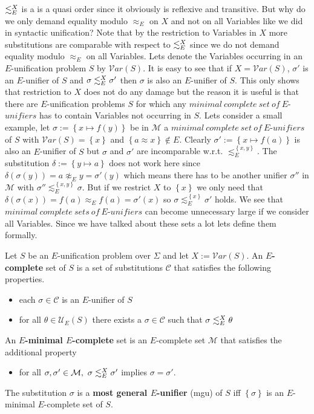 $\lesssim^X_E$ is a is a quasi order since it obviously is reflexive and transitive. But why do we only demand equality modulo $\approx_E$ on $X$ and not on all Variables like we did in syntactic unification? Note that by the restriction to Variables in $X$ more substitutions are comparable with respect to $\lesssim^X_E$ since we do not demand equality modulo $\approx_E$ on all Variables. Lets denote the Variables occurring in an $E$-unification problem $S$ by $\mathcal{V}ar(S)$. It is easy to see that if $X=\mathcal{V}ar(S)$, $\sigma'$ is an $E$-unifier of $S$ and $\sigma\lesssim^X_E\sigma'$ then $\sigma$ is also an $E$-unifier of $S$. This only shows that restriction to $X$ does not do any damage but the reason it is useful is that there are $E$-unification problems $S$ for which any $minimal\ complete\ set\ of\ E$-$unifiers$ has to contain Variables not occurring in $S$. Lets consider a small example, let $\sigma:=\left\lbrace x\mapsto f(y)\right\rbrace$ be in $\mathcal{M}$ a $minimal\ complete\ set\ of\ E$-$unifiers$ of $S$ with $\mathcal{V}ar(S)=\left\lbrace x\right\rbrace$ and $\left\lbrace a\approx x\right\rbrace \notin E$. Clearly $\sigma':=\left\lbrace x\mapsto f(a)\right\rbrace$ is also an $E$-unifier of $S$ but $\sigma$ and $\sigma'$ are incomparable w.r.t. $\lesssim^{\left\lbrace x,y\right\rbrace }_E$. The substitution $\delta:=\left\lbrace y\mapsto a\right\rbrace $ does not work here since $\delta(\sigma(y))=a \not\approx_E y=\sigma'(y)$ which means there has to be another unifier $\sigma''$ in $\mathcal{M}$ with $\sigma''\lesssim^{\left\lbrace x,y\right\rbrace }_E\sigma$. But if we restrict $X$ to $\left\lbrace x\right\rbrace $ we only need that $\delta(\sigma(x))=f(a) \approx_E f(a)=\sigma'(x)$ so $\sigma\lesssim^{\left\lbrace x\right\rbrace }_E\sigma'$ holds. We see that $minimal\ complete\ sets\ of\ E$-$unifiers$ can become unnecessary large if we consider all Variables. Since we have talked about these sets a lot lets define them formally.
\begin{definition}
	Let $S$ be an $E$-unification problem over $\Sigma$ and let $X:=\mathcal{V}ar(S)$. An \textbf{$E$-complete} set of $S$ is a set of substitutions $\mathcal{C}$ that satisfies the following properties.
	\begin{itemize}
		\item each $\sigma \in \mathcal{C}$ is an $E$-unifier of $S$
		\item for all $\theta \in\mathcal{U}_E(S)$ there exists a $\sigma \in \mathcal{C}$ such that $\sigma\lesssim^X_E\theta$
	\end{itemize}
	An \textbf{$E$-minimal $E$-complete} set is an $E$-complete set  $\mathcal{M}$ that satisfies the additional property
	\begin{itemize}
		\item for all $\sigma,\sigma'\in\mathcal{M},\ \sigma\moreGeneral\sigma'$ implies $\sigma=\sigma'$.
	\end{itemize}
	The substitution $\sigma$ is a \textbf{most general $E$-unifier} (mgu) of $S$ iff $\left\lbrace \sigma\right\rbrace$ is an $E$-minimal $E$-complete set of $S$.
\end{definition}
